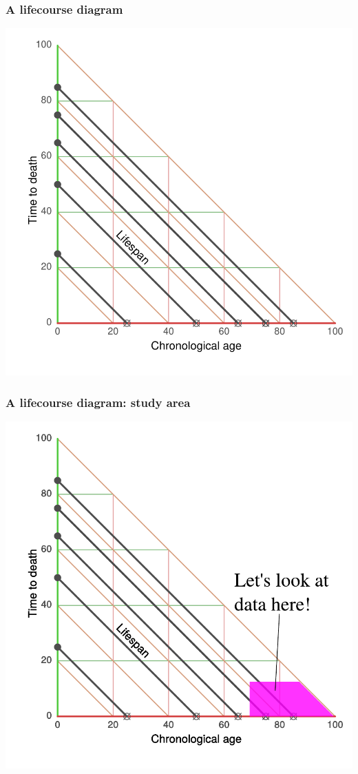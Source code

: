 \documentclass[20pt]{beamer}
\begin{document}
\begin{frame}
\frametitle{A lifecourse diagram}
\centering
\includegraphics[scale=1]{Figures/TALrt.pdf}\\
\end{frame}

\begin{frame}
\frametitle{A lifecourse diagram: study area}
\centering
\includegraphics[scale=1]{Figures/TALHRS.pdf}\\
\end{frame}
\end{document}
